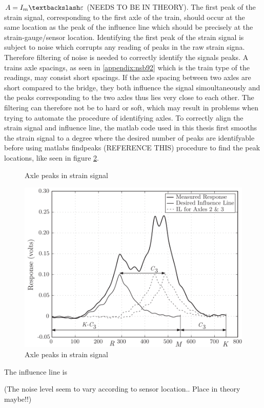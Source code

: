 $A = I_m \textbackslash \varepsilon$ 
(NEEDS TO BE IN THEORY).
The first peak of the strain signal, corresponding to the first axle of the train, should occur at the same location as the peak of the influence line which should be precisely at the strain-gauge/sensor location.
Identifying the first peak of the strain signal is subject to noise which corrupts any reading of peaks in the raw strain signa. Therefore filtering of noise is needed to correctly identify the signals peaks. A trains axle spacings, as seen in \ref{appendix:nsb92} which is the train type of the readings, may consist short spacings. If the axle spacing between two axles are short compared to the bridge, they both influence the signal simoultaneously and the peaks corresponding to the two axles thus lies very close to each other. The filtering can therefore not be to hard or soft, which may result in problems when trying to automate the procedure of identifying axles.
To correctly align the strain signal and influence line, the matlab code used in this thesis first smooths the strain signal to a degree where the desired number of peaks are identifyable before using matlabs findpeaks (REFERENCE THIS) procedure to find the peak locations, like seen in figure \ref{fig:axle_peaks}.
\begin{figure}[htbp]
	\centering
	
	\caption{Axle peaks in strain signal}
	\label{fig:axle_peaks}
\end{figure}
\begin{figure}[htbp]
	\centering
	\includegraphics[width=\textwidth]{figures/strain_vs_influenceline}
	\caption{Axle peaks in strain signal}
	\label{fig:axle_peaks}
\end{figure}

The influence line is



(The noise level seem to vary according to sensor location.. Place in theory maybe!!)
